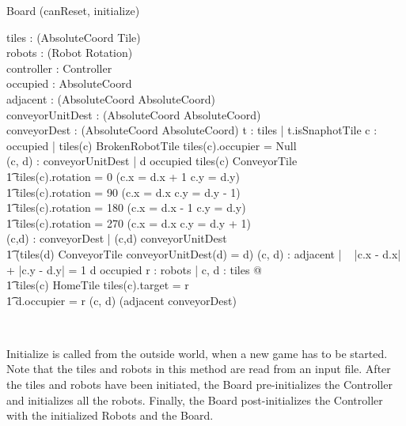 \documentclass[12pt]{article}
\begin{document}
\begin{class}{Board}
\upharpoonright (canReset, initialize) \\
\begin{state}
tiles : \power (AbsoluteCoord \fun \: \downarrow \! Tile) \\
robots : \power (Robot \fun Rotation) \\
\also \also \also
controller : Controller \\
occupied : \power AbsoluteCoord \\
adjacent : \power (AbsoluteCoord \rel AbsoluteCoord) \\
conveyorUnitDest : \power (AbsoluteCoord \pinj AbsoluteCoord) \\
conveyorDest : \power (AbsoluteCoord \pinj AbsoluteCoord)
\where
\forall t : \ran tiles | \neg t.isSnaphotTile
\also \also \also \also
\forall c : occupied | tiles(c) \in BrokenRobotTile \vee
tiles(c).occupier \not = Null \\
\also \also \also \also
\forall (c, d) : conveyorUnitDest | d \not \in occupied \; \wedge tiles(c) \in ConveyorTile \; \; \wedge \\ \t1
        tiles(c).rotation = 0 \Rightarrow (c.x = d.x + 1 \wedge c.y = d.y) \; \; \wedge \\ \t1
        tiles(c).rotation = 90 \Rightarrow (c.x = d.x \wedge c.y = d.y - 1) \; \; \wedge \\ \t1
        tiles(c).rotation = 180 \Rightarrow (c.x = d.x - 1 \wedge c.y = d.y) \; \; \wedge \\ \t1
        tiles(c).rotation = 270 \Rightarrow (c.x = d.x \wedge c.y = d.y + 1) \; \; \\
\also \also \also \also
\forall (c,d) : conveyorDest | (c,d) \in conveyorUnitDest \star \; \; \wedge \\ \t1 (tiles(d) \not \in ConveyorTile \vee conveyorUnitDest(d) = d)
\also \also \also \also
\forall (c, d) : adjacent | ~ |\!c.x - d.x\!| + |\!c.y - d.y\!| = 1 \wedge d \not \in occupied
\also \also \also \also
\forall r : robots | \exists c, d : \dom tiles @  \\ \t1 tiles(c) \in HomeTile \wedge tiles(c).target = r \; \; \wedge \\ \t1
d.occupier = r \wedge (c, d) \in (adjacent \cup conveyorDest)\star
\end{state} \\
\begin{classcom}
Initialize is called from the outside world, when a new game has to be started. Note that the tiles and robots in this method are read from an input file. After the tiles and robots have been initiated, the Board pre-initializes the Controller and initializes all the robots. Finally, the Board post-initializes the Controller with the initialized Robots and the Board.

\end{classcom}
\end{class}
\end{document}
